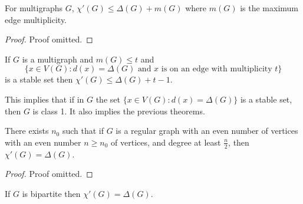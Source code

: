 \documentclass[main.tex]{subfiles}
\begin{document}
\begin{theorem}
  For multigraphs $G$, $\chi'(G)\leq\Delta(G) + m(G)$ where $m(G)$
  is the maximum edge multiplicity.
\end{theorem}
\begin{proof}
  Proof omitted.
\end{proof}
\begin{theorem}
  If $G$ is a multigraph and $m(G)\leq t$ and
  \[
    \{x\in V(G) : d(x) = \Delta(G)\text{ and }x\text{ is on an edge with multiplicity }t\}
  \]
  is a stable set then $\chi'(G)\leq\Delta(G) + t - 1$.
\end{theorem}
This implies that if in $G$ the set $\{x\in V(G) : d(x) = \Delta(G)\}$ is
a stable set, then $G$ is class 1.
It also implies the previous theorems.

\begin{theorem}
  There exists $n_0$ such that if $G$ is a regular graph with an even number of
  vertices with an even number $n\geq n_0$ of vertices,
  and degree at least $\frac n 2$, then $\chi'(G) = \Delta(G)$.
\end{theorem}
\begin{proof}
  Proof omitted.
\end{proof}
\begin{theorem}[Konig 1916]
  If $G$ is bipartite then $\chi'(G) = \Delta(G)$.
\end{theorem}
\end{document}
